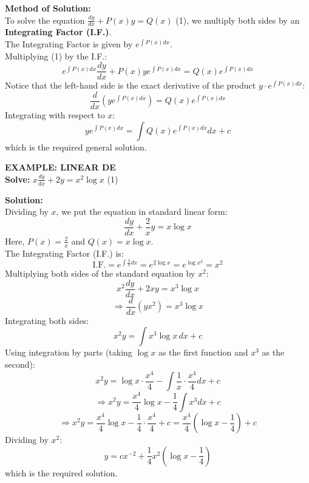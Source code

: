 \documentclass[11pt,a4paper]{article}
\begin{document}
\vspace{0.2cm}
\noindent\textbf{\textcolor{DeepNavy}{Method of Solution:}} \\
To solve the equation $\frac{dy}{dx} + P(x)y = Q(x)$ (1), we multiply both sides by an \textbf{Integrating Factor (I.F.)}. \\
The Integrating Factor is given by $e^{\int P(x)dx}$. \\
Multiplying (1) by the I.F.:
\[ e^{\int P(x)dx} \frac{dy}{dx} + P(x)y e^{\int P(x)dx} = Q(x)e^{\int P(x)dx} \]
Notice that the left-hand side is the exact derivative of the product $y \cdot e^{\int P(x)dx}$:
\[ \frac{d}{dx} \left( y e^{\int P(x)dx} \right) = Q(x) e^{\int P(x)dx} \]
Integrating with respect to $x$:
\[ y e^{\int P(x)dx} = \int Q(x) e^{\int P(x)dx} dx + c \]
which is the required general solution.

\begin{tcolorbox}[colback=LightBg, colframe=BorderGray, arc=4mm]
    {\small\textbf{\textcolor{AccentBlue}{EXAMPLE: LINEAR DE}}}
    \vspace{0.2cm}\\
    \textbf{Solve:} $\displaystyle x\frac{dy}{dx} + 2y = x^2\log x$ \hfill (1)
    
    \vspace{0.2cm}
    \textbf{Solution:} \\
    Dividing by $x$, we put the equation in standard linear form:
    \[ \frac{dy}{dx} + \frac{2}{x}y = x \log x \]
    Here, $P(x) = \frac{2}{x}$ and $Q(x) = x \log x$. \\
    The Integrating Factor (I.F.) is:
    \[ \text{I.F.} = e^{\int \frac{2}{x}dx} = e^{2\log x} = e^{\log x^2} = x^2 \]
    Multiplying both sides of the standard equation by $x^2$:
    \[ x^2\frac{dy}{dx} + 2xy = x^3\log x \]
    \[ \Rightarrow \frac{d}{dx} (y x^2) = x^3 \log x \]
    Integrating both sides:
    \[ x^2 y = \int x^3 \log x \, dx + c \]
    Using integration by parts (taking $\log x$ as the first function and $x^3$ as the second):
    \[ x^2 y = \log x \cdot \frac{x^4}{4} - \int \frac{1}{x} \cdot \frac{x^4}{4} dx + c \]
    \[ \Rightarrow x^2 y = \frac{x^4}{4} \log x - \frac{1}{4} \int x^3 dx + c \]
    \[ \Rightarrow x^2 y = \frac{x^4}{4} \log x - \frac{1}{4} \cdot \frac{x^4}{4} + c = \frac{x^4}{4} \left(\log x - \frac{1}{4}\right) + c \]
    Dividing by $x^2$:
    \[ y = cx^{-2} + \frac{1}{4} x^2 \left(\log x - \frac{1}{4}\right) \]
    which is the required solution.
\end{tcolorbox}
\end{document}
